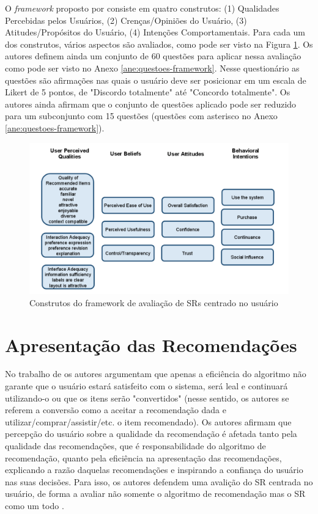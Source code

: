 O \textit{framework} proposto por  consiste em quatro construtos: (1) Qualidades Percebidas pelos
Usuários, (2) Crenças/Opiniões do Usuário, (3) Atitudes/Propósitos do Usuário, (4) Intenções Comportamentais.
Para cada um dos construtos, vários aspectos são avaliados, como pode ser visto na Figura \ref{fig:resque-framework}.
Os autores definem ainda um conjunto de 60 questões para aplicar nessa avaliação como pode ser visto no Anexo
\ref{ane:questoes-framework}. Nesse questionário as questões são afirmações nas quais o usuário deve ser posicionar em
um escala de Likert de 5 pontos, de "Discordo totalmente" até "Concordo totalmente". Os autores ainda afirmam que o
conjunto de questões aplicado pode ser reduzido para um subconjunto com 15 questões (questões com asterisco no Anexo
\ref{ane:questoes-framework}).

\begin{figure}[htb]
  \caption{\label{fig:resque-framework}Construtos do framework de avaliação de SRs centrado no usuário}
  \begin{center}
      \includegraphics[scale=0.6]{./Figuras/resque-framework.png}
  \end{center}
\end{figure}

\section{Apresentação das Recomendações}

No trabalho de  os autores argumentam que apenas a eficiência do algoritmo não garante
que o usuário estará satisfeito com o sistema, será leal e continuará utilizando-o ou que os itens serão "convertidos"
(nesse sentido, os autores se referem a conversão como a aceitar a recomendação dada e utilizar/comprar/assistir/etc.
o item recomendado). Os autores afirmam que percepção do usuário sobre a qualidade da recomendação é afetada tanto pela
qualidade das recomendações, que é responsabilidade do algoritmo de recomendação, quanto pela eficiência na apresentação
das recomendações, explicando a razão daquelas recomendações e inspirando a confiança do usuário nas suas decisões.
Para isso, os autores defendem uma avalição do SR centrada no usuário, de forma a avaliar não somente o algoritmo de
recomendação mas o SR como um todo \cite{pu2012evaluating}.


